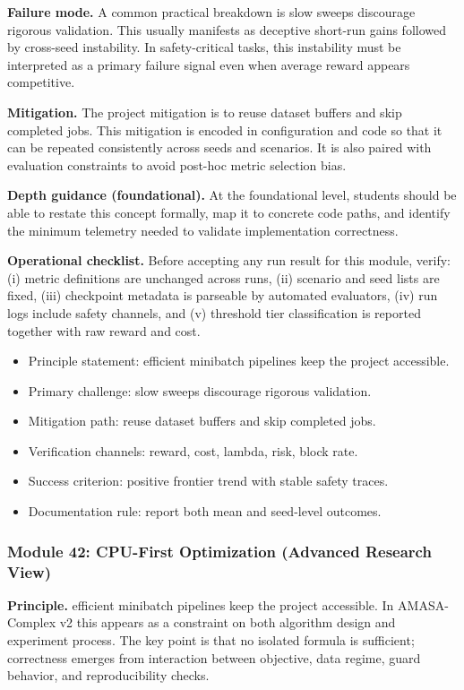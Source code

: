 \documentclass[conference]{IEEEtran}
\begin{document}
\textbf{Failure mode.} A common practical breakdown is slow sweeps discourage rigorous validation. This usually manifests as deceptive short-run gains followed by cross-seed instability. In safety-critical tasks, this instability must be interpreted as a primary failure signal even when average reward appears competitive.

\textbf{Mitigation.} The project mitigation is to reuse dataset buffers and skip completed jobs. This mitigation is encoded in configuration and code so that it can be repeated consistently across seeds and scenarios. It is also paired with evaluation constraints to avoid post-hoc metric selection bias.

\textbf{Depth guidance (foundational).} At the foundational level, students should be able to restate this concept formally, map it to concrete code paths, and identify the minimum telemetry needed to validate implementation correctness.

\textbf{Operational checklist.} Before accepting any run result for this module, verify: (i) metric definitions are unchanged across runs, (ii) scenario and seed lists are fixed, (iii) checkpoint metadata is parseable by automated evaluators, (iv) run logs include safety channels, and (v) threshold tier classification is reported together with raw reward and cost.

\begin{itemize}[leftmargin=*]
  \item Principle statement: efficient minibatch pipelines keep the project accessible.
  \item Primary challenge: slow sweeps discourage rigorous validation.
  \item Mitigation path: reuse dataset buffers and skip completed jobs.
  \item Verification channels: reward, cost, lambda, risk, block rate.
  \item Success criterion: positive frontier trend with stable safety traces.
  \item Documentation rule: report both mean and seed-level outcomes.
\end{itemize}


\subsubsection{Module 42: CPU-First Optimization (Advanced Research View)}
\textbf{Principle.} efficient minibatch pipelines keep the project accessible. In AMASA-Complex v2 this appears as a constraint on both algorithm design and experiment process. The key point is that no isolated formula is sufficient; correctness emerges from interaction between objective, data regime, guard behavior, and reproducibility checks.
\end{document}
